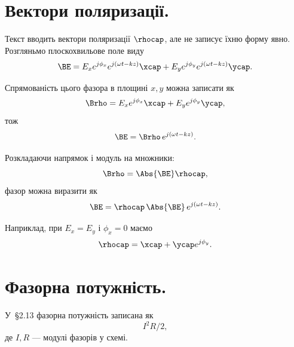 
\section{Вектори поляризації.}
Текст вводить вектори поляризації \(\rhocap\), але не записує їхню форму явно. Розгляньмо плоскохвильове поле виду
\begin{equation}\label{eqn:chapter2Notes:840}
\BE
=
E_x e^{j \phi_x} e^{j (\omega t - k z)} \xcap
+
E_y e^{j \phi_y} e^{j (\omega t - k z)} \ycap.
\end{equation}

Спрямованість цього фазора в площині \(x, y\) можна записати як
\begin{equation}\label{eqn:chapter2Notes:860}
\Brho =
E_x e^{j \phi_x} \xcap
+
E_y e^{j \phi_y} \ycap,
\end{equation}
тож
\begin{equation}\label{eqn:chapter2Notes:880}
\BE = \Brho\, e^{j (\omega t - k z)}.
\end{equation}

Розкладаючи напрямок і модуль на множники:
\begin{equation}\label{eqn:chapter2Notes:900}
\Brho = \Abs{\BE} \rhocap,
\end{equation}
фазор можна виразити як
\begin{equation}\label{eqn:chapter2Notes:920}
\BE = \rhocap\, \Abs{\BE}\, e^{j (\omega t - k z)}.
\end{equation}

Наприклад, при \(E_x = E_y\) і \(\phi_x = 0\) маємо
\begin{equation}\label{eqn:chapter2Notes:940}
\rhocap = \xcap + \ycap e^{j \phi_y}.
\end{equation}



\section{Фазорна потужність.}
У~\S2.13 фазорна потужність записана як
\begin{equation}\label{eqn:chapter2Notes:620}
I^2 R/2,
\end{equation}
де \(I, R\) — модулі фазорів у схемі.

